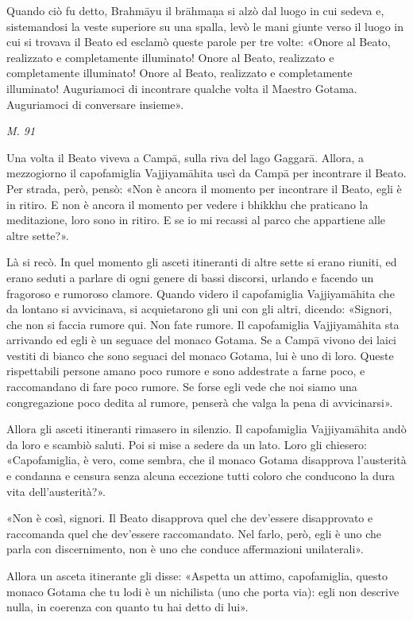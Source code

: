 Quando ciò fu detto, Brahmāyu il brāhmaṇa si alzò dal luogo in cui
sedeva e, sistemandosi la veste superiore su una spalla, levò le mani
giunte verso il luogo in cui si trovava il Beato ed esclamò queste
parole per tre volte: «Onore al Beato, realizzato e completamente
illuminato! Onore al Beato, realizzato e completamente illuminato! Onore
al Beato, realizzato e completamente illuminato! Auguriamoci di
incontrare qualche volta il Maestro Gotama. Auguriamoci di conversare
insieme».


\emph{M. 91}


Una volta il Beato viveva a Campā, sulla riva del lago Gaggarā. Allora,
a mezzogiorno il capofamiglia Vajjiyamāhita uscì da Campā per incontrare
il Beato. Per strada, però, pensò: «Non è ancora il momento per
incontrare il Beato, egli è in ritiro. E non è ancora il momento per
vedere i bhikkhu che praticano la meditazione, loro sono in ritiro. E se
io mi recassi al parco che appartiene alle altre sette?».


Là si recò. In quel momento gli asceti itineranti di altre sette si
erano riuniti, ed erano seduti a parlare di ogni genere di bassi
discorsi, urlando e facendo un fragoroso e rumoroso clamore. Quando
videro il capofamiglia Vajjiyamāhita che da lontano si avvicinava, si
acquietarono gli uni con gli altri, dicendo: «Signori, che non si faccia
rumore qui. Non fate rumore. Il capofamiglia Vajjiyamāhita sta arrivando
ed egli è un seguace del monaco Gotama. Se a Campā vivono dei laici
vestiti di bianco che sono seguaci del monaco Gotama, lui è uno di loro.
Queste rispettabili persone amano poco rumore e sono addestrate a farne
poco, e raccomandano di fare poco rumore. Se forse egli vede che noi
siamo una congregazione poco dedita al rumore, penserà che valga la pena
di avvicinarsi».


Allora gli asceti itineranti rimasero in silenzio. Il capofamiglia
Vajjiyamāhita andò da loro e scambiò saluti. Poi si mise a sedere da un
lato. Loro gli chiesero: «Capofamiglia, è vero, come sembra, che il
monaco Gotama disapprova l’austerità e condanna e censura senza alcuna
eccezione tutti coloro che conducono la dura vita dell’austerità?».


«Non è così, signori. Il Beato disapprova quel che dev’essere
disapprovato e raccomanda quel che dev’essere raccomandato. Nel farlo,
però, egli è uno che parla con discernimento, non è uno che conduce
affermazioni unilaterali».


Allora un asceta itinerante gli disse: «Aspetta un attimo, capofamiglia,
questo monaco Gotama che tu lodi è un nichilista (uno che porta via):
egli non descrive nulla, in coerenza con quanto tu hai detto di lui».


